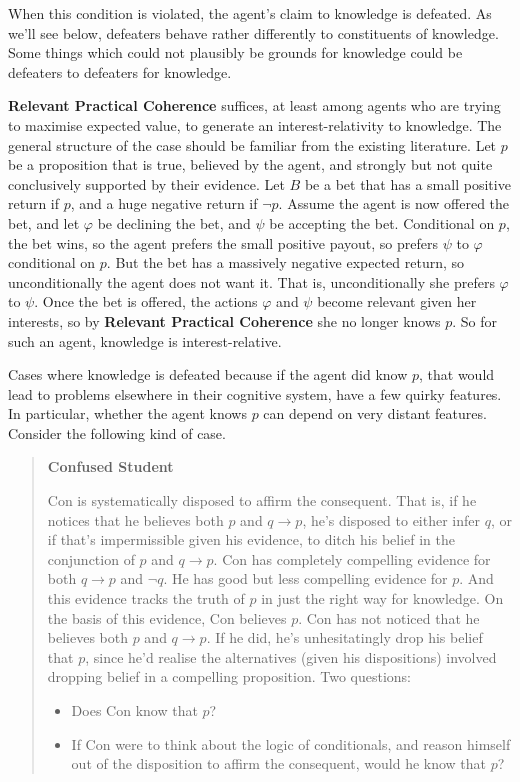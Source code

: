 \documentclass[
  11pt,
  letterpaper,
  DIV=11,
  numbers=noendperiod,
  oneside]{scrartcl}
\begin{document}
When this condition is violated, the agent's claim to knowledge is
defeated. As we'll see below, defeaters behave rather differently to
constituents of knowledge. Some things which could not plausibly be
grounds for knowledge could be defeaters to defeaters for knowledge.

\textbf{Relevant Practical Coherence} suffices, at least among agents
who are trying to maximise expected value, to generate an
interest-relativity to knowledge. The general structure of the case
should be familiar from the existing literature. Let \(p\) be a
proposition that is true, believed by the agent, and strongly but not
quite conclusively supported by their evidence. Let \(B\) be a bet that
has a small positive return if \(p\), and a huge negative return if
\(\neg p\). Assume the agent is now offered the bet, and let \(\varphi\)
be declining the bet, and \(\psi\) be accepting the bet. Conditional on
\(p\), the bet wins, so the agent prefers the small positive payout, so
prefers \(\psi\) to \(\varphi\) conditional on \(p\). But the bet has a
massively negative expected return, so unconditionally the agent does
not want it. That is, unconditionally she prefers \(\varphi\) to
\(\psi\). Once the bet is offered, the actions \(\varphi\) and \(\psi\)
become relevant given her interests, so by \textbf{Relevant Practical
Coherence} she no longer knows \(p\). So for such an agent, knowledge is
interest-relative.

Cases where knowledge is defeated because if the agent did know \(p\),
that would lead to problems elsewhere in their cognitive system, have a
few quirky features. In particular, whether the agent knows \(p\) can
depend on very distant features. Consider the following kind of case.

\begin{quote}
\textbf{Confused Student}

Con is systematically disposed to affirm the consequent. That is, if he
notices that he believes both \(p\) and \(q \rightarrow p\), he's
disposed to either infer \(q\), or if that's impermissible given his
evidence, to ditch his belief in the conjunction of \(p\) and
\(q \rightarrow p\). Con has completely compelling evidence for both
\(q \rightarrow p\) and \(\neg q\). He has good but less compelling
evidence for \(p\). And this evidence tracks the truth of \(p\) in just
the right way for knowledge. On the basis of this evidence, Con believes
\(p\). Con has not noticed that he believes both \(p\) and
\(q \rightarrow p\). If he did, he's unhesitatingly drop his belief that
\(p\), since he'd realise the alternatives (given his dispositions)
involved dropping belief in a compelling proposition. Two questions:

\begin{itemize}
\item
  Does Con know that \(p\)?
\item
  If Con were to think about the logic of conditionals, and reason
  himself out of the disposition to affirm the consequent, would he know
  that \(p\)?
\end{itemize}
\end{quote}
\end{document}
